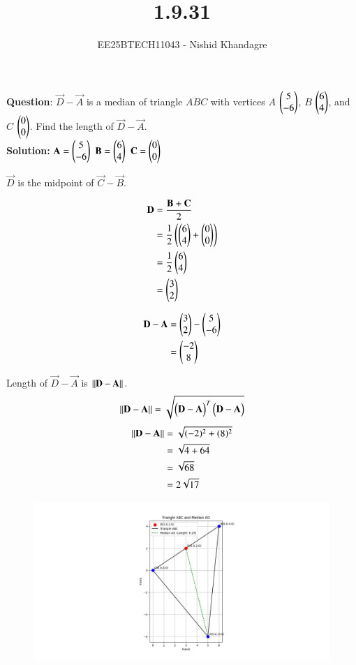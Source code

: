 \documentclass[journal]{IEEEtran}
\title{1.9.31}
\author{EE25BTECH11043 - Nishid Khandagre} %
\begin{document}
\maketitle

\renewcommand{\thefigure}{\theenumi}
\renewcommand{\thetable}{\theenumi}


\textbf{Question}:
$\vec{D}-\vec{A}$ is a median of triangle $ABC$ with vertices $A$ $\begin{pmatrix} 5\\-6\end{pmatrix}$, $B$ $\begin{pmatrix} 6\\4 \end{pmatrix}$, and $C$ $\begin{pmatrix} 0\\0 \end{pmatrix}$. Find the length of $\vec{D}-\vec{A}$.
\\

\textbf{Solution: }
$\mathbf{A} = \begin{pmatrix} 5 \\ -6 \end{pmatrix}$
$\mathbf{B} = \begin{pmatrix} 6 \\ 4 \end{pmatrix}$
$\mathbf{C} = \begin{pmatrix} 0 \\ 0 \end{pmatrix}$

$\vec{D}$ is the midpoint of $\vec{C}-\vec{B}$.

\begin{align}
\mathbf{D} &= \frac{\mathbf{B} + \mathbf{C}}{2} \\
&= \frac{1}{2}\left(\begin{pmatrix}6 \\ 4\end{pmatrix} + \begin{pmatrix}0 \\ 0\end{pmatrix}\right) \\
&= \frac{1}{2}\begin{pmatrix}6 \\ 4\end{pmatrix} \\
&= \begin{pmatrix}3 \\ 2\end{pmatrix}
\end{align}


\begin{align}
\mathbf{D}-\mathbf{A} &= \begin{pmatrix}3 \\ 2\end{pmatrix} - \begin{pmatrix}5 \\ -6\end{pmatrix} \\
&= \begin{pmatrix}-2 \\ 8\end{pmatrix}
\end{align}

Length of $\vec{D} - \vec{A}$ is $\left\lVert\mathbf{D}-\mathbf{A}\right\rVert$.
\begin{align}
\left\lVert\mathbf{D}-\mathbf{A}\right\rVert = \sqrt{\begin{pmatrix}\mathbf{D}-\mathbf{A}\end{pmatrix}^T\begin{pmatrix}\mathbf{D} - \mathbf{A}\end{pmatrix}}
\end{align}
\begin{align}
\left\lVert\mathbf{D}-\mathbf{A}\right\rVert &= \sqrt{(-2)^2 + (8)^2} \\
&= \sqrt{4 + 64} \\
&= \sqrt{68} \\
&= 2\sqrt{17}
\end{align}

\begin{figure}[H]
   \centering
  \includegraphics[width=1.0\columnwidth]{figs/fig1.png}
   \caption{}
   \label{fig:1}
\end{figure}
\end{document}
